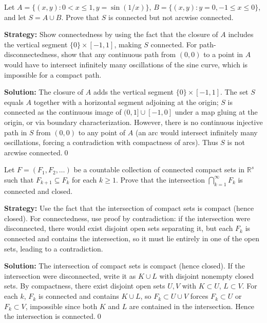 \begin{problembox}
Let $A = \{(x, y) : 0 < x \leq 1, y = \sin(1/x)\}$, $B = \{(x, y) : y = 0, -1 \leq x \leq 0\}$, and let $S = A \cup B$. Prove that $S$ is connected but not arcwise connected.
\end{problembox}

\noindent\textbf{Strategy:} Show connectedness by using the fact that the closure of $A$ includes the vertical segment $\{0\} \times [-1,1]$, making $S$ connected. For path-disconnectedness, show that any continuous path from $(0,0)$ to a point in $A$ would have to intersect infinitely many oscillations of the sine curve, which is impossible for a compact path.

\bigskip\noindent\textbf{Solution:}
The closure of $A$ adds the vertical segment $\{0\}\times[-1,1]$. The set $S$ equals $A$ together with a horizontal segment adjoining at the origin; $S$ is connected as the continuous image of $(0,1]\cup[-1,0]$ under a map gluing at the origin, or via boundary characterization. However, there is no continuous injective path in $S$ from $(0,0)$ to any point of $A$ (an arc would intersect infinitely many oscillations, forcing a contradiction with compactness of arcs). Thus $S$ is not arcwise connected.\qed



\begin{problembox}
Let $F = (F_1, F_2, \ldots)$ be a countable collection of connected compact sets in $\mathbb{R}^s$ such that $F_{k+1} \subseteq F_k$ for each $k \geq 1$. Prove that the intersection $\bigcap_{k=1}^{\infty} F_k$ is connected and closed.
\end{problembox}

\noindent\textbf{Strategy:} Use the fact that the intersection of compact sets is compact (hence closed). For connectedness, use proof by contradiction: if the intersection were disconnected, there would exist disjoint open sets separating it, but each $F_k$ is connected and contains the intersection, so it must lie entirely in one of the open sets, leading to a contradiction.

\bigskip\noindent\textbf{Solution:}
The intersection of compact sets is compact (hence closed). If the intersection were disconnected, write it as $K\cup L$ with disjoint nonempty closed sets. By compactness, there exist disjoint open sets $U,V$ with $K\subset U$, $L\subset V$. For each $k$, $F_k$ is connected and contains $K\cup L$, so $F_k\subset U\cup V$ forces $F_k\subset U$ or $F_k\subset V$, impossible since both $K$ and $L$ are contained in the intersection. Hence the intersection is connected.\qed



